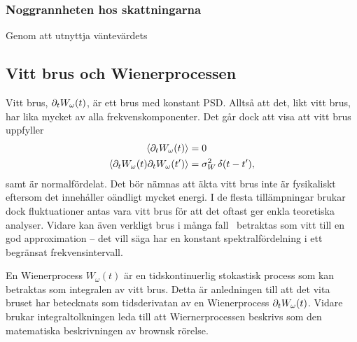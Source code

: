 \subsubsection{Noggrannheten hos skattningarna}
Genom att utnyttja väntevärdets 


\subsection{Vitt brus och Wienerprocessen}\label{sec:white_noise}
Vitt brus, $\partial_tW_\omega(t)$,\footnotemark{} är ett brus med konstant PSD. Alltså att det, likt vitt brus, har lika mycket av alla frekvenskomponenter. Det går dock att visa att vitt brus uppfyller \cite{Miller_probability2012}
\begin{equation}\label{eq:white_noise}
\begin{aligned}
\ev{\pd_tW_\omega(t)}&=0 \\
\ev{\pd_tW_\omega(t)\pd_tW_\omega(t')}&= \sigma_W^2 \, \delta(t-t'),
\end{aligned}
\end{equation}
samt är normalfördelat. 
Det bör nämnas att äkta vitt brus inte är fysikaliskt eftersom det innehåller oändligt mycket energi. I de flesta tillämpningar brukar dock fluktuationer antas vara vitt brus för att det oftast ger enkla teoretiska analyser. Vidare kan även verkligt brus i många fall~\cite{Engelberg_noise2007} betraktas som vitt till en god approximation -- det vill säga har en konstant spektralfördelning i ett begränsat frekvensintervall.


En Wienerprocess $W_\omega(t)$ är en tidskontinuerlig stokastisk process som kan betraktas som integralen av vitt brus\cite{Miller_probability2012}. Detta är anledningen till att det vita bruset har betecknats som tidsderivatan av en Wienerprocess $\partial_tW_\omega(t)$. Vidare brukar integraltolkningen leda till att Wiernerprocessen beskrivs som den matematiska beskrivningen av brownsk rörelse. 

